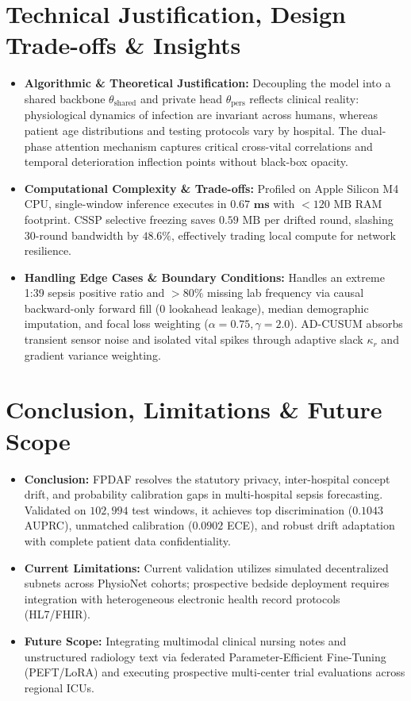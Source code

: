 \documentclass[11pt, a4paper]{article}
\begin{document}
\section{Technical Justification, Design Trade-offs \& Insights}
\begin{itemize}[noitemsep, topsep=1pt]
    \item \textbf{Algorithmic \& Theoretical Justification:} Decoupling the model into a shared backbone $\theta_{\text{shared}}$ and private head $\theta_{\text{pers}}$ reflects clinical reality: physiological dynamics of infection are invariant across humans, whereas patient age distributions and testing protocols vary by hospital. The dual-phase attention mechanism captures critical cross-vital correlations and temporal deterioration inflection points without black-box opacity.
    \item \textbf{Computational Complexity \& Trade-offs:} Profiled on Apple Silicon M4 CPU, single-window inference executes in $\mathbf{0.67\text{ ms}}$ with $< 120\text{ MB}$ RAM footprint. CSSP selective freezing saves $0.59\text{ MB}$ per drifted round, slashing 30-round bandwidth by $\mathbf{48.6\%}$, effectively trading local compute for network resilience.
    \item \textbf{Handling Edge Cases \& Boundary Conditions:} Handles an extreme 1:39 sepsis positive ratio and $>80\%$ missing lab frequency via causal backward-only forward fill (0 lookahead leakage), median demographic imputation, and focal loss weighting ($\alpha=0.75, \gamma=2.0$). AD-CUSUM absorbs transient sensor noise and isolated vital spikes through adaptive slack $\kappa_r$ and gradient variance weighting.
\end{itemize}

\section{Conclusion, Limitations \& Future Scope}
\begin{itemize}[noitemsep, topsep=1pt]
    \item \textbf{Conclusion:} FPDAF resolves the statutory privacy, inter-hospital concept drift, and probability calibration gaps in multi-hospital sepsis forecasting. Validated on $102,994$ test windows, it achieves top discrimination ($0.1043$ AUPRC), unmatched calibration ($0.0902$ ECE), and robust drift adaptation with complete patient data confidentiality.
    \item \textbf{Current Limitations:} Current validation utilizes simulated decentralized subnets across PhysioNet cohorts; prospective bedside deployment requires integration with heterogeneous electronic health record protocols (HL7/FHIR).
    \item \textbf{Future Scope:} Integrating multimodal clinical nursing notes and unstructured radiology text via federated Parameter-Efficient Fine-Tuning (PEFT/LoRA) and executing prospective multi-center trial evaluations across regional ICUs.
\end{itemize}
\end{document}
